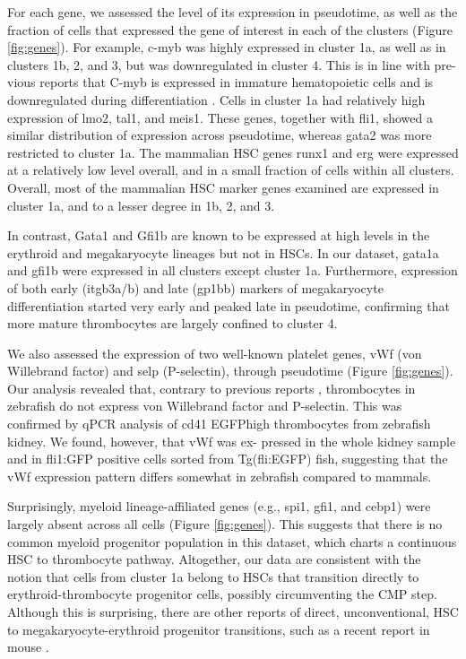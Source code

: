 For each gene, we assessed the level of its expression in pseudotime, as well as the fraction of cells that expressed the gene of interest in each of the clusters (Figure \ref{fig:genes}). For example, c-myb was highly expressed in cluster 1a, as well as in clusters 1b, 2, and 3, but was downregulated in cluster 4. This is in line with pre- vious reports that C-myb is expressed in immature hematopoietic cells and is downregulated during differentiation  \cite{Greig2008-ab}. Cells in cluster 1a had relatively high expression of lmo2, tal1, and meis1. These genes, together with fli1, showed a similar distribution of expression across pseudotime, whereas gata2 was more restricted to cluster 1a. The mammalian HSC genes runx1 and erg were expressed at a relatively low level overall, and in a small fraction of cells within all clusters. Overall, most of the mammalian HSC marker genes examined are expressed in cluster 1a, and to a lesser degree in 1b, 2, and 3.

In contrast, Gata1 and Gfi1b are known to be expressed at high levels in the erythroid and megakaryocyte lineages  \cite{Orkin2008-os, Vassen2007-ul} but not in HSCs. In our dataset, gata1a and gfi1b were expressed in all clusters except cluster 1a. Furthermore, expression of both early (itgb3a/b) and late (gp1bb) markers of megakaryocyte differentiation started very early and peaked late in pseudotime, confirming that more mature thrombocytes are largely confined to cluster 4.

We also assessed the expression of two well-known platelet genes, vWf (von Willebrand factor) and selp (P-selectin), through pseudotime (Figure \ref{fig:genes}). Our analysis revealed that, contrary to previous reports  \cite{Carrillo2010-gy}, thrombocytes in zebrafish do not express von Willebrand factor and P-selectin. This was confirmed by qPCR analysis of cd41 EGFPhigh thrombocytes from zebrafish kidney. We found, however, that vWf was ex- pressed in the whole kidney sample and in fli1:GFP positive cells sorted from Tg(fli:EGFP) fish, suggesting that the vWf expression pattern differs somewhat in zebrafish compared to mammals.

Surprisingly, myeloid lineage-affiliated genes (e.g., spi1, gfi1, and cebp1) were largely absent across all cells (Figure \ref{fig:genes}). This suggests that there is no common myeloid progenitor population in this dataset, which charts a continuous HSC to thrombocyte pathway. Altogether, our data are consistent with the notion that cells from cluster 1a belong to HSCs that transition directly to erythroid-thrombocyte progenitor cells, possibly circumventing the CMP step. Although this is surprising, there are other reports of direct, unconventional, HSC to megakaryocyte-erythroid progenitor transitions, such as a recent report in mouse \cite{Guo2013-si}.

